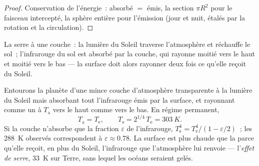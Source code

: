 \begin{proof}
Conservation de l'énergie~: absorbé $= $ émis, la section $\pi R^2$
pour le faisceau intercepté, la sphère entière pour l'émission (jour et
nuit, étalés par la rotation et la circulation).
\end{proof}

\begin{omfigure}

{\small La serre à une couche~: la lumière du Soleil traverse l'atmosphère et
réchauffe le sol~; l'infrarouge du sol est absorbé par la couche, qui
rayonne moitié vers le haut et moitié vers le bas --- la surface doit alors rayonner deux fois
ce qu'elle reçoit du Soleil.}
\end{omfigure}

\begin{proposition}\label{prop:b2:thermal-radiation:greenhouse}
Entourons la planète d'une mince couche d'atmosphère transparente
à la lumière du Soleil mais absorbant tout l'infrarouge émis par la surface, et
rayonnant comme un  à $T_{\text{a}}$ vers le haut comme vers le bas. En régime
permanent,
\[
T_{\text{a}} = T_{\text{e}}, \qquad
T_{\text{s}} = 2^{1/4}\,T_{\text{e}} = \qty{303}{K} .
\]
Si la couche n'absorbe que la fraction $\varepsilon$ de l'infrarouge,
$T_{\text{s}}^4 = T_{\text{e}}^4/(1 - \varepsilon/2)$~; les \qty{288}{K}
observés correspondent à $\varepsilon \approx 0.78$. La surface est
plus chaude que la  parce qu'elle reçoit, en plus
du Soleil, l'infrarouge que l'atmosphère lui renvoie ---
l'\emph{effet de serre}, \qty{33}{K} sur Terre,
sans lequel les océans seraient gelés.
\end{proposition}

